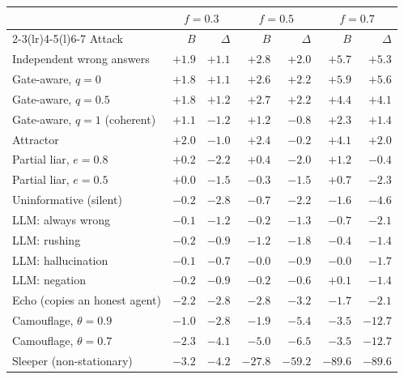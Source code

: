 \begin{tabular}{@{}lrrrrrr@{}}
\toprule
 & \multicolumn{2}{c}{$f=0.3$} & \multicolumn{2}{c}{$f=0.5$} & \multicolumn{2}{c}{$f=0.7$}\\
\cmidrule(lr){2-3}\cmidrule(lr){4-5}\cmidrule(l){6-7}
Attack & $B$ & $\Delta$ & $B$ & $\Delta$ & $B$ & $\Delta$\\
\midrule
Independent wrong answers & $+1.9$ & $+1.1$ & $+2.8$ & $+2.0$ & $+5.7$ & $+5.3$\\
Gate-aware, $q=0$ & $+1.8$ & $+1.1$ & $+2.6$ & $+2.2$ & $+5.9$ & $+5.6$\\
Gate-aware, $q=0.5$ & $+1.8$ & $+1.2$ & $+2.7$ & $+2.2$ & $+4.4$ & $+4.1$\\
Gate-aware, $q=1$ (coherent) & $+1.1$ & $-1.2$ & $+1.2$ & $-0.8$ & $+2.3$ & $+1.4$\\
Attractor & $+2.0$ & $-1.0$ & $+2.4$ & $-0.2$ & $+4.1$ & $+2.0$\\
Partial liar, $e=0.8$ & $+0.2$ & $-2.2$ & $+0.4$ & $-2.0$ & $+1.2$ & $-0.4$\\
Partial liar, $e=0.5$ & $+0.0$ & $-1.5$ & $-0.3$ & $-1.5$ & $+0.7$ & $-2.3$\\
Uninformative (silent) & $-0.2$ & $-2.8$ & $-0.7$ & $-2.2$ & $-1.6$ & $-4.6$\\
LLM: always wrong & $-0.1$ & $-1.2$ & $-0.2$ & $-1.3$ & $-0.7$ & $-2.1$\\
LLM: rushing & $-0.2$ & $-0.9$ & $-1.2$ & $-1.8$ & $-0.4$ & $-1.4$\\
LLM: hallucination & $-0.1$ & $-0.7$ & $-0.0$ & $-0.9$ & $-0.0$ & $-1.7$\\
LLM: negation & $-0.2$ & $-0.9$ & $-0.2$ & $-0.6$ & $+0.1$ & $-1.4$\\
Echo (copies an honest agent) & $-2.2$ & $-2.8$ & $-2.8$ & $-3.2$ & $-1.7$ & $-2.1$\\
Camouflage, $\theta=0.9$ & $-1.0$ & $-2.8$ & $-1.9$ & $-5.4$ & $-3.5$ & $-12.7$\\
Camouflage, $\theta=0.7$ & $-2.3$ & $-4.1$ & $-5.0$ & $-6.5$ & $-3.5$ & $-12.7$\\
Sleeper (non-stationary) & $-3.2$ & $-4.2$ & $-27.8$ & $-59.2$ & $-89.6$ & $-89.6$\\
\bottomrule
\end{tabular}
